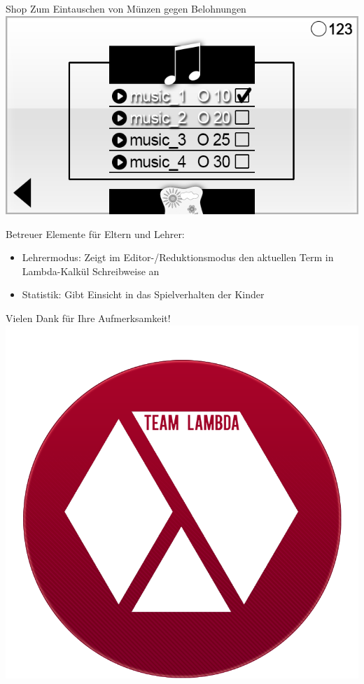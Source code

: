 \documentclass[18pt]{beamer}
\begin{document}
\begin{frame}{Shop}
	Zum Eintauschen von Münzen gegen Belohnungen
	\includegraphics[scale=0.5]{../gui/_jpeg/shop_popup}
\end{frame}

\begin{frame}{Betreuer}
	Elemente für Eltern und Lehrer:
	\begin{itemize}[<+->]
	\item Lehrermodus: Zeigt im Editor-/Reduktionsmodus den aktuellen Term in Lambda-Kalkül Schreibweise an
	\item Statistik: Gibt Einsicht in das Spielverhalten der Kinder
	\end{itemize}
\end{frame}

\begin{frame}
	\centering
	\huge Vielen Dank für Ihre Aufmerksamkeit!
	\includegraphics[scale=0.8]{team_lambda_lg.png}
\end{frame}
\end{document}
